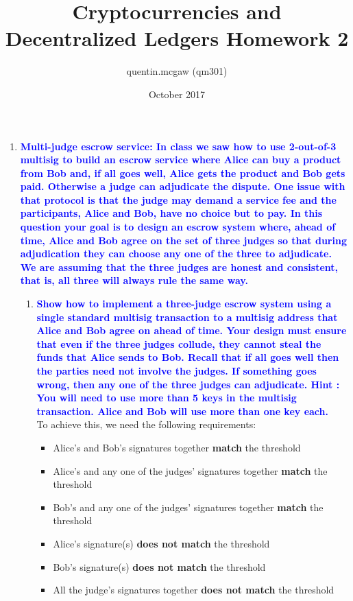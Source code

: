 \documentclass[11pt]{article}
\title{Cryptocurrencies and Decentralized Ledgers Homework 2}
\author{quentin.mcgaw (qm301)}
\date{October 2017}
\begin{document}
\maketitle

\begin{enumerate}

\item \textbf{\textcolor{blue}{Multi-judge escrow service: In class we saw how to use 2-out-of-3 multisig to build an escrow service where Alice can buy a product from Bob and, if all goes well, Alice gets the product and Bob gets paid. Otherwise a judge can adjudicate the dispute. One issue with that protocol is that the judge may demand a service fee and the participants, Alice and Bob, have no choice but to pay. In this question your goal is to design an escrow system where, ahead of time, Alice and Bob agree on the set of three judges so that during adjudication they can choose any one of the three to adjudicate. We are assuming that the three judges are honest and consistent, that is, all three will always rule the same way.}}
    \begin{enumerate}
    \item \textbf{\textcolor{blue}{Show how to implement a three-judge escrow system using a single standard multisig transaction to a multisig address that Alice and Bob agree on ahead of time. Your design must ensure that even if the three judges collude, they cannot steal the funds that Alice sends to Bob. Recall that if all goes well then the parties need not involve the judges. If
    something goes wrong, then any one of the three judges can adjudicate. Hint : You will need to use more than 5 keys in the multisig transaction. Alice and Bob will use more than one key each.}}
        \\ To achieve this, we need the following requirements:
        \begin{itemize}
            \item Alice's and Bob's signatures together \textbf{match} the threshold
            \item Alice's and any one of the judges' signatures together \textbf{match} the threshold
            \item Bob's and any one of the judges' signatures together \textbf{match} the threshold
            \item Alice's signature(s) \textbf{does not match} the threshold
            \item Bob's signature(s) \textbf{does not match} the threshold
            \item All the judge's signatures together \textbf{does not match} the threshold

\end{itemize}
\end{enumerate}
\end{enumerate}
\end{document}

